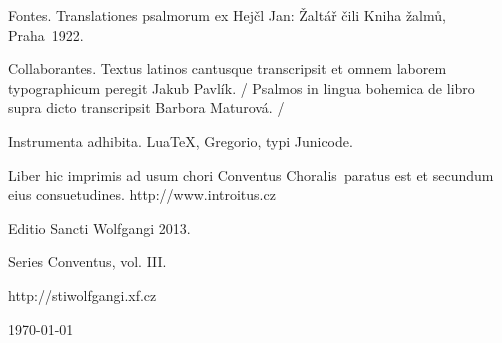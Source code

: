 \documentclass[a4paper, twoside, 12pt]{article}
\newcommand{\annusEditionis}{2013}
\begin{document}



\pagebreak





\pagebreak




\pagebreak






\pagebreak

\pagestyle{empty}

\tableofcontents

\vfill

\pagebreak

Fontes. 
Translationes psalmorum ex
Hejčl Jan: Žaltář čili Kniha žalmů, Praha~1922.

Collaborantes.
Textus latinos cantusque transcripsit et omnem laborem typographicum peregit
Jakub Pavlík. /
Psalmos in lingua bohemica de libro supra dicto transcripsit
Barbora Maturová. /

Instrumenta adhibita.
LuaTeX, %
Gregorio, %
typi Junicode. %

\begin{center}
Liber hic imprimis ad usum chori 
\guillemotright Conventus Choralis\guillemotleft\ 
paratus est
et secundum eius consuetudines.
http://www.introitus.cz

\vspace{1cm}

{\large Editio Sancti Wolfgangi \annusEditionis .}

\vspace{2mm}

Series \guillemotright Conventus\guillemotleft, vol. III.

\vspace{1cm}

http://stiwolfgangi.xf.cz

\vfill

\today

\end{center}
\end{document}
